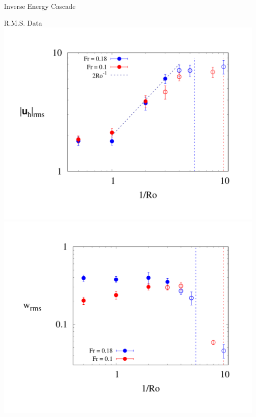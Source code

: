 \documentclass{beamer}
\begin{document}
\begin{frame}{Inverse Energy Cascade}
    \emp

\end{frame}
\begin{frame}{R.M.S. Data}
        \centering
        \includegraphics[width=1\textwidth]{images/urms_plot.pdf}
    \emp
        \centering
        \includegraphics[width=1\textwidth]{images/wrms_plot.pdf}
    \emp
    

\end{frame}
\end{document}
